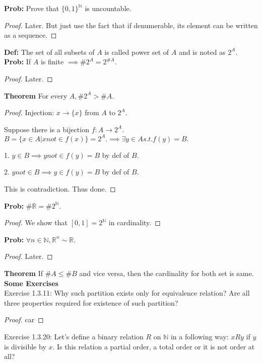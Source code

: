 \documentclass[a4paper]{article}
\newcommand{\R}{\mathbb{R}}
\newcommand{\N}{\mathbb{N}}
\begin{document}
\noindent \textbf{Prob:} Prove that $\{0,1\}^{\N}$ is uncountable.
\begin{proof}
	Later. But just use the fact that if denumerable, its element can be written as a sequence.
\end{proof}

\noindent \textbf{Def:} The set of all subsets of $A$ is called power set of $A$ and is noted as $2^{A}$.\\

\noindent \textbf{Prob:} If $A$ is finite $\implies \# 2^{A} = 2^{\# A}$.
\begin{proof}
	Later.
\end{proof}

\noindent \textbf{Theorem} For every $A, \#2^{A} > \#A$.
\begin{proof}
	Injection: $x \to \{x\}$ from $A$ to $2^{A}$.

	Suppose there is a bijection $f: A \to  2^{A}$. $B = \{x \in A | x not\in f(x)\}=2^{A}. \implies \exists y \in A s.t. f(y)=B.$ 

	1. $y \in B \implies y not \in f(y)=B$ by def of $B$.

	2. $y not \in B \implies y \in f(y) =B$ by def of $B$.

	This is contradiction. Thus done.
\end{proof}

\noindent \textbf{Prob:} $\# \R = \# 2^{\N}$.
\begin{proof}
	We show that $[0,1] = 2^{\N}$ in cardinality.
\end{proof}

\noindent \textbf{Prob:} $\forall n \in \N, \R^{n} \sim \R$.
\begin{proof}
	Later.
\end{proof}

\noindent \textbf{Theorem} If $\# A \le \# B$ and vice versa, then the cardinality for both set is same.\\

\noindent \textbf{Some Exercises}\\

\noindent Exercise 1.3.11: Why such partition exists only for equivalence relation? Are all three properties required for existence of such partition?

\begin{proof}
	car
\end{proof}

\noindent Exercise 1.3.20: Let's define a binary relation $R$ on $\N$ in a following way: $xR y$ if $y$ is divisible by $x$. Is this relation a partial order, a total order or it is not order at all?
\end{document}
